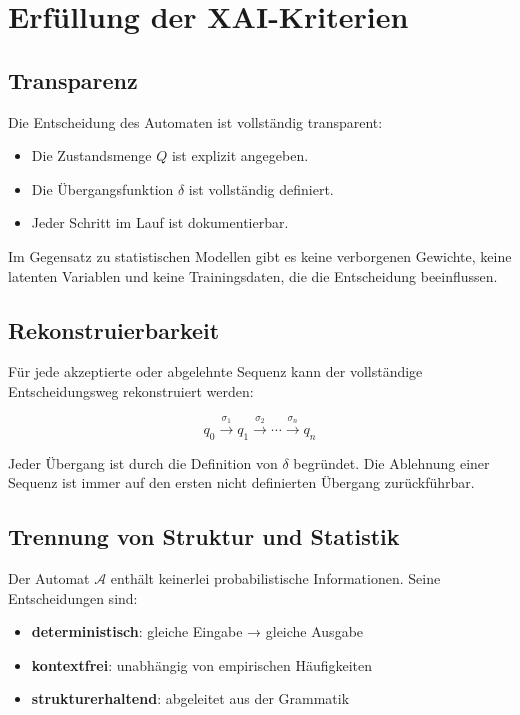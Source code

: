 \documentclass[
  12pt,
  a4paper,
  oneside,
  titlepage
]{article}
\begin{document}
\section{Erfüllung der XAI-Kriterien}

\subsection{Transparenz}

Die Entscheidung des Automaten ist vollständig transparent:

\begin{itemize}
    \item Die Zustandsmenge \(Q\) ist explizit angegeben.
    \item Die Übergangsfunktion \(\delta\) ist vollständig definiert.
    \item Jeder Schritt im Lauf ist dokumentierbar.
\end{itemize}

Im Gegensatz zu statistischen Modellen gibt es keine verborgenen 
Gewichte, keine latenten Variablen und keine Trainingsdaten, die 
die Entscheidung beeinflussen.

\subsection{Rekonstruierbarkeit}

Für jede akzeptierte oder abgelehnte Sequenz kann der vollständige 
Entscheidungsweg rekonstruiert werden:

\[
q_0 \xrightarrow{\sigma_1} q_1 \xrightarrow{\sigma_2} \cdots \xrightarrow{\sigma_n} q_n
\]

Jeder Übergang ist durch die Definition von \(\delta\) begründet. 
Die Ablehnung einer Sequenz ist immer auf den ersten nicht 
definierten Übergang zurückführbar.

\subsection{Trennung von Struktur und Statistik}

Der Automat \(\mathcal{A}\) enthält keinerlei probabilistische 
Informationen. Seine Entscheidungen sind:

\begin{itemize}
    \item \textbf{deterministisch}: gleiche Eingabe → gleiche Ausgabe
    \item \textbf{kontextfrei}: unabhängig von empirischen Häufigkeiten
    \item \textbf{strukturerhaltend}: abgeleitet aus der Grammatik
\end{itemize}
\end{document}
